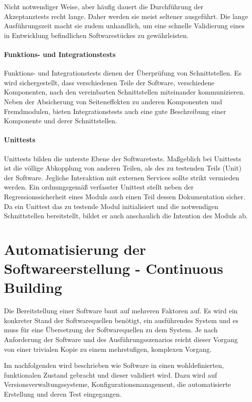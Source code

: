 \documentclass[10pt,a4paper]{book}
\begin{document}
Nicht notwendiger Weise, aber häufig dauert die Durchführung der Akzeptanztests recht lange. Daher werden sie meist seltener ausgeführt. Die lange Ausführungszeit macht sie zudem unhandlich, um eine schnelle Validierung eines in Entwicklung befindlichen Softwarestückes zu gewährleisten.

\paragraph{Funktions- und Integrationstests}

Funktions- und Integrationstests dienen der Überprüfung von Schnittstellen. Es wird sichergestellt, dass verschiedenen Teile der Software, verschiedene Komponenten, nach den vereinbarten Schnittstellen miteinander kommunizieren.
Neben der Absicherung von Seiteneffekten zu anderen Komponenten und Fremdmodulen, bieten Integrationstests auch eine gute Beschreibung einer Komponente und derer Schnittstellen.

\paragraph{Unittests}

Unittests bilden die unterste Ebene der Softwaretests. Maßgeblich bei Unittests ist die völlige Abkopplung von anderen Teilen, als des zu testenden Teils (Unit) der Software. Jegliche Interaktion mit externen Services sollte strikt vermieden werden.
Ein ordnungsgemäß verfasster Unittest stellt neben der Regressionssicherheit eines Moduls auch einen Teil dessen Dokumentation sicher. Da ein Unittest das zu testende Modul initialisiert und die notwendigen Schnittstellen bereitstellt, bildet er auch anschaulich die Intention des Moduls ab.

\section{Automatisierung der Softwareerstellung - Continuous Building}

Die Bereitstellung einer Software baut auf mehreren Faktoren auf. Es wird ein konkreter Stand der Softwarequellen benötigt, ein ausführendes System und es muss für eine Übersetzung der Softwarequellen zu dem System.
Je nach Anforderung der Software und des Ausführungsszenarios reicht dieser Vorgang von einer trivialen Kopie zu einem mehrstufigen, komplexen Vorgang. 

Im nachfolgenden wird beschrieben wie Software in einen wohldefinierten, funktionalen Zustand gebracht und dieser validiert wird. Dazu wird auf Versionsverwaltungssysteme, Konfigurationsmanagement, die automatisierte Erstellung und deren Test eingegangen.
\end{document}
